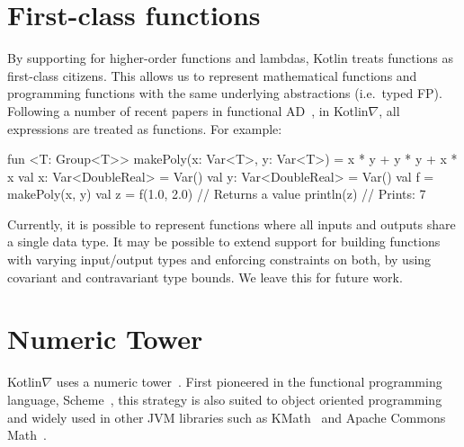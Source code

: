 \documentclass[12pt,initial,twoside,maitrise]{dms}
\numberwithin{equation}{section}
\numberwithin{table}{chapter}
\numberwithin{figure}{chapter}
\begin{document}
\section{First-class functions}\label{sec:first-class-functions}

By supporting for higher-order functions and lambdas, Kotlin treats functions as first-class citizens. This allows us to represent mathematical functions and programming functions with the same underlying abstractions (i.e.\ typed FP). Following a number of recent papers in functional AD~\citep{pearlmutter2008reverse,wang2018backpropagation}, in Kotlin$\nabla$, all expressions are treated as functions. For example:

\begin{kotlinlisting}
fun <T: Group<T>> makePoly(x: Var<T>, y: Var<T>) = x * y + y * y + x * x
val x: Var<DoubleReal> = Var()
val y: Var<DoubleReal> = Var()
val f = makePoly(x, y)
val z = f(1.0, 2.0) // Returns a value
println(z) // Prints: 7
\end{kotlinlisting}
%
Currently, it is possible to represent functions where all inputs and outputs share a single data type. It may be possible to extend support for building functions with varying input/output types and enforcing constraints on both, by using covariant and contravariant type bounds. We leave this for future work.

\section{Numeric Tower}\label{sec:numeric-tower}

Kotlin$\nabla$ uses a numeric tower~\citep{st2012typing}. First pioneered in the functional programming language, Scheme~\citep{sperber2009revised}, this strategy is also suited to object oriented programming~\citep{niculescu2003design, niculescu2011using} and widely used in other JVM libraries such as KMath~\citep{nozik2019acat} and Apache Commons Math~\citep{developers2012apache}.
\end{document}
